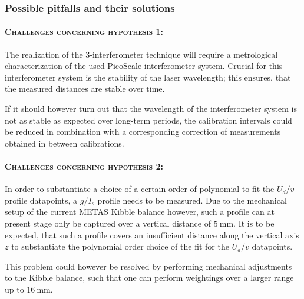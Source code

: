 \documentclass{article}
\begin{document}
%

\subsubsection*{Possible pitfalls and their solutions}
\paragraph*{\normalfont \textsc{Challenges concerning hypothesis 1:}} The realization of the 3-interferometer technique will require a metrological characterization of the used PicoScale interferometer system. Crucial for this interferometer system is the stability of the laser wavelength; this ensures, that the measured distances are stable over time. 

If it should however turn out that the wavelength of the interferometer system is not as stable as expected over long-term periods, the calibration intervals could be reduced in combination with a corresponding correction of measurements obtained in between calibrations.

\paragraph*{\normalfont \textsc{Challenges concerning hypothesis 2:}} In order to substantiate a choice of a certain order of polynomial to fit the $U_d/v$ profile datapoints, a $g/I_s$ profile needs to be measured. Due to the mechanical setup of the current METAS Kibble balance however, such a profile can at present stage only be captured over a vertical distance of $\SI{5}{\milli\meter}$. It is to be expected, that such a profile covers an insufficient distance along the vertical axis $z$ to substantiate the polynomial order choice of the fit for the $U_d/v$ datapoints. 

This problem could however be resolved by performing mechanical adjustments to the Kibble balance, such that one can perform weightings over a larger range up to $\SI{16}{\milli\meter}$.
\end{document}
